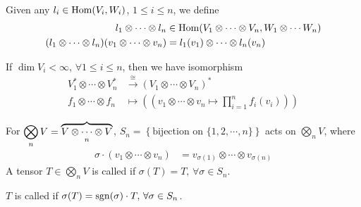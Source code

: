 Given any  $ l_i\in \mathrm{Hom}(V_i,W_i) $, $ 1 \leq i \leq n $, we define 
\begin{equation}
    \begin{aligned}
        l_1\otimes\cdots \otimes l_n&\in \mathrm{Hom}(V_1\otimes \cdots \otimes V_n,W_1\otimes \cdots W_n)\\
        (l_1\otimes\cdots \otimes l_n)(v_1\otimes \cdots \otimes v_n)&=l_1(v_1)\otimes \cdots \otimes l_n(v_n)
    \end{aligned}
\end{equation}  
\begin{proposition}
    If  $ \dim V_i<\infty $,  $ \forall 1 \leq i \leq n $, then we have isomorphism 
    \begin{equation}
        \begin{aligned}
            V_1^*\otimes \cdots \otimes V_n^*&\xrightarrow{\cong}(V_1\otimes \cdots \otimes V_n)^*\\
            f_1\otimes \cdots \otimes f_n&\mapsto \left((v_1\otimes \cdots \otimes v_n\mapsto \prod_{i=1}^nf_i(v_i))\right)
        \end{aligned}
    \end{equation}
\end{proposition}
For  \(\displaystyle\bigotimes\limits_{n}V=\displaystyle\overbrace{\displaystyle V\otimes\cdots \otimes V}_n \),  $ S_n=\left\{\text{bijection on }\{1,2,\cdots,n\}\right\} $ acts on  $ \bigotimes\limits_n V $, where 
\begin{equation}
    \begin{aligned}
        \sigma\cdot (v_1\otimes \cdots \otimes v_n)&=v_{\sigma(1)}\otimes \cdots \otimes v_{\sigma(n)}
    \end{aligned}
\end{equation} 
A tensor  $ T\in \bigotimes\limits_n V$ is called  if  $ \sigma(T)=T,\,\forall \sigma\in S_n $.

$ T $ is called  if  $ \sigma(T)=\mathrm{sgn}(\sigma)\cdot T ,\,\forall \sigma\in S_n $.

